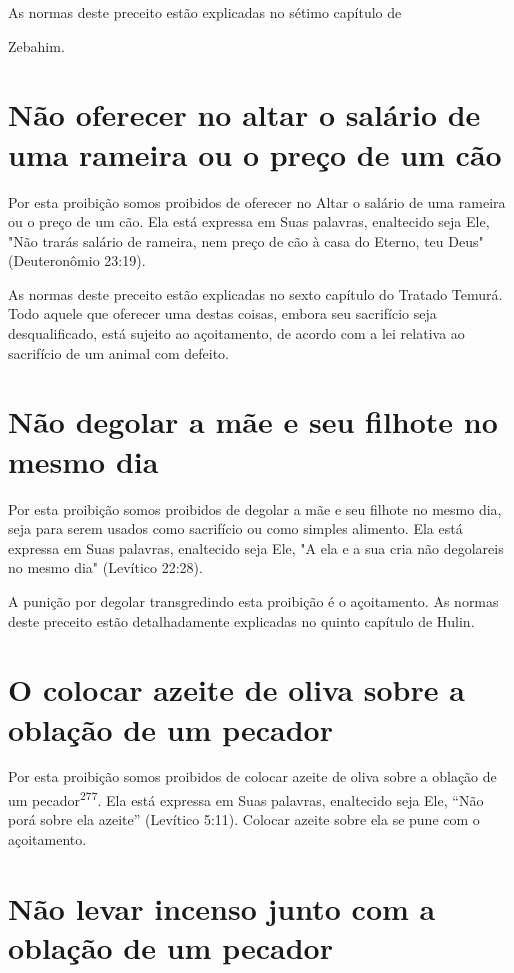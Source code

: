 As normas deste preceito estão explicadas no sétimo capítulo de


Zebahim.


\section{Não oferecer no altar o salário de uma rameira ou o preço de um cão}

Por esta proibição somos proibidos de oferecer no Altar o salário de uma
rameira ou o preço de um cão. Ela está expressa em Suas palavras,
enal­tecido seja Ele, "Não trarás salário de rameira, nem preço de cão à
casa do Eter­no, teu Deus" (Deuteronômio 23:19).

As normas deste preceito estão explicadas no sexto capítulo do Tra­tado
Temurá. Todo aquele que oferecer uma destas coisas, embora seu
sacrifí­cio seja desqualificado, está sujeito ao açoitamento, de acordo
com a lei relati­va ao sacrifício de um animal com defeito.

\section{Não degolar a mãe e seu filhote no mesmo dia}

Por esta proibição somos proibidos de degolar a mãe e seu filhote no
mesmo dia, seja para serem usados como sacrifício ou como simples
alimento. Ela está expressa em Suas palavras, enaltecido seja Ele, "A
ela e a sua cria não degolareis no mesmo dia" (Levítico 22:28).

A punição por degolar transgredindo esta proibição é o açoitamento. As
normas deste preceito estão detalhadamente explicadas no quin­to
capítulo de Hulin.


\section{O colocar azeite de oliva sobre a oblação de um pecador}

Por esta proibição somos proibidos de colocar azeite de oliva sobre a
oblação de um pecador\textsuperscript{277}. Ela está expressa em Suas
palavras, enaltecido se­ja Ele, ``Não porá sobre ela azeite'' (Levítico
5:11). Colocar azeite sobre ela se pune com o açoitamento.


\section{Não levar incenso junto com a oblação de um pecador}


